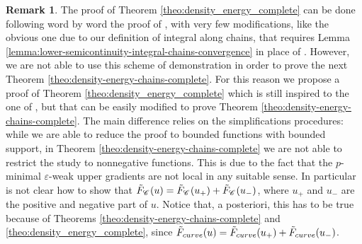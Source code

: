 \documentclass[12pt]{amsart}
\theoremstyle{definition}
\newtheorem{remark}[theorem]{Remark}
\newcommand{\Chain}[1]{\mathscr{C}^{#1}}
\newcommand{\relF}[1]{\tilde{\rm F}_{{\rm #1}}}
\begin{document}
\begin{remark}
\label{rem:comments_between_CC_EB}
The proof of Theorem \ref{theo:density_energy_complete} can be done following word by word the proof of \cite[Theorem 1.1]{Eriksson-Bique-Density-in-energy}, with very few modifications, like the obvious one due to our definition of integral along chains, that requires Lemma \ref{lemma:lower-semicontinuity-integral-chains-convergence} in place of \cite[Lemma 2.19]{Eriksson-Bique-Density-in-energy}. However, we are not able to use this scheme of demonstration in order to prove the next Theorem \ref{theo:density-energy-chains-complete}. For this reason we propose a proof of Theorem \ref{theo:density_energy_complete} which is still inspired to the one of \cite[Theorem 1.1]{Eriksson-Bique-Density-in-energy}, but that can be easily modified to prove Theorem \ref{theo:density-energy-chains-complete}. The main difference relies on the simplifications procedures: while we are able to reduce the proof to bounded functions with bounded support, in Theorem \ref{theo:density-energy-chains-complete} we are not able to restrict the study to nonnegative functions. This is due to the fact that the $p$-minimal $\varepsilon$-weak upper gradients are not local in any suitable sense. In particular is not clear how to show that $\relF{\Chain{}}(u) = \relF{\Chain{}}(u_+) + \relF{\Chain{}}(u_-)$, where $u_+$ and $u_-$ are the positive and negative part of $u$. Notice that, a posteriori, this has to be true because of Theorems \ref{theo:density-energy-chains-complete} and \ref{theo:density_energy_complete}, since $\relF{curve}(u) = \relF{curve}(u_+) + \relF{curve}(u_-)$.
\end{remark}
%
\end{document}
